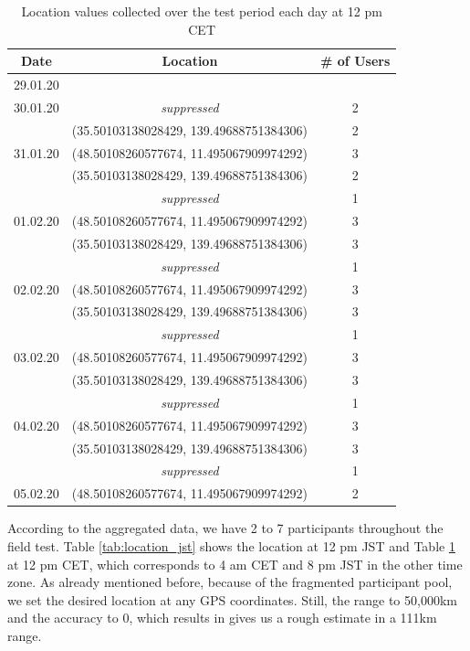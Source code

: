 \begin{table}[htbp]
	\centering
	\begin{tabular}{|c|c|c|} 
		\hline
		\textbf{Date} & \textbf{Location} & \textbf{\# of Users}\\ [0.5ex] 
		\hline
		29.01.20 &  & \\ 
		\hline
		30.01.20 &\textit{suppressed} & 2 \\ 
		& (35.50103138028429, 139.49688751384306) & 2 \\
		\hline
		31.01.20 & (48.50108260577674, 11.495067909974292) & 3 \\ 
		& (35.50103138028429, 139.49688751384306) & 2 \\
		&\textit{suppressed} & 1 \\
		\hline
		01.02.20 & (48.50108260577674, 11.495067909974292) & 3 \\ 
		& (35.50103138028429, 139.49688751384306) & 3 \\
		&\textit{suppressed} & 1 \\
		\hline
		02.02.20 & (48.50108260577674, 11.495067909974292) & 3 \\ 
		& (35.50103138028429, 139.49688751384306) & 3 \\
		&\textit{suppressed} & 1 \\
		\hline
		03.02.20 & (48.50108260577674, 11.495067909974292) & 3 \\ 
		& (35.50103138028429, 139.49688751384306) & 3 \\
		&\textit{suppressed} & 1 \\
		\hline
		04.02.20 & (48.50108260577674, 11.495067909974292) & 3 \\ 
		& (35.50103138028429, 139.49688751384306) & 3 \\
		&\textit{suppressed} & 1 \\
		\hline
		05.02.20 & (48.50108260577674, 11.495067909974292) & 2 \\ 
		\hline
	\end{tabular}
	\caption{Location values collected over the test period each day at 12 pm CET}
	\label{tab:location_cet}
\end{table}

According to the aggregated data, we have 2 to 7 participants throughout the field test. Table \ref{tab:location_jst} shows the location at 12 pm JST and Table \ref{tab:location_cet} at 12 pm CET, which corresponds to 4 am CET and 8 pm JST in the other time zone. As already mentioned before, because of the fragmented participant pool, we set the desired location at any GPS coordinates. Still, the range to 50,000km and the accuracy to 0, which results in gives us a rough estimate in a 111km range.


